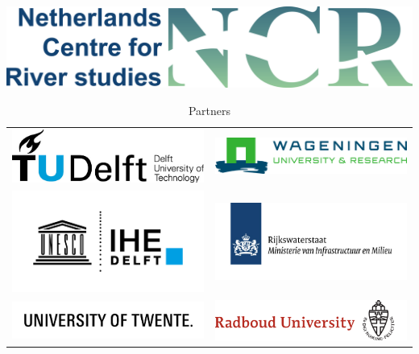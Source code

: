 \begin{table}
        \includegraphics[width=\textwidth]{figures/ncrlogo_plustext.png}
    \vspace{2cm}
    \caption*{\huge  Partners}
    
    \begin{tabular}{cc}
        \includegraphics[width = 2.5in]{figures/tudlogo.jpg} &
        \includegraphics[width = 2.5in]{figures/wageningenlogo.png} \\
        \includegraphics[width = 2.5in]{figures/ihedelftlogo.png} &
        \includegraphics[width = 2.5in]{figures/rijkswaterstaatlogo.jpg}\\
        \includegraphics[width = 2.5in]{figures/Twentelogo.jpg} &
        \includegraphics[width = 2.5in]{figures/radboudlogo.png} \\

\end{tabular}
\end{table}
